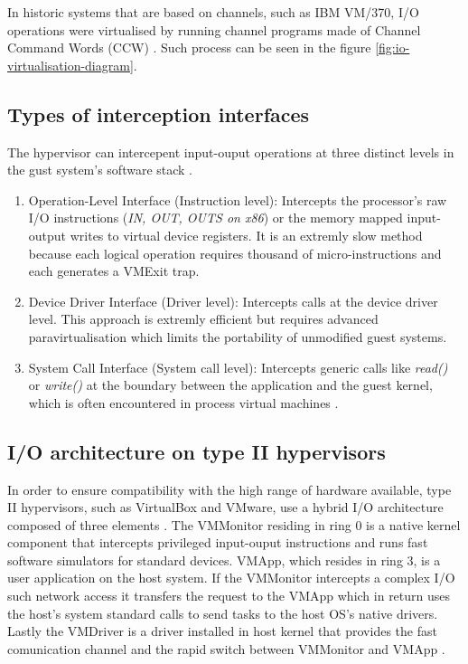 In historic systems that are based on channels, such as IBM VM/370, I/O operations were virtualised by running channel programs made of Channel Command Words (CCW) \cite{smith2005virtual}. Such process can be seen in the figure \ref{fig:io-virtualisation-diagram}.

\subsection{Types of interception interfaces}
The hypervisor can intercepent input-ouput operations at three distinct levels in the gust system's software stack \cite{smith2005virtual}.
    
    \begin{enumerate}
        \item Operation-Level Interface (Instruction level): Intercepts the processor's raw I/O instructions (\emph{IN, OUT, OUTS on x86}) or the memory mapped input-output writes to virtual device registers. It is an extremly slow method because each logical operation requires thousand of micro-instructions and each generates a VMExit trap.
        \item Device Driver Interface (Driver level): Intercepts calls at the device driver level. This approach is extremly efficient but requires advanced paravirtualisation which limits the portability of unmodified guest systems.
        \item System Call Interface (System call level): Intercepts generic calls like \emph{read()} or \emph{write()} at the boundary between the application and the guest kernel, which is often encountered in process virtual machines \cite{smith2005virtual}.
    \end{enumerate}

\subsection{I/O architecture on type II hypervisors}
In order to ensure compatibility with the high range of hardware available, type II hypervisors, such as VirtualBox and VMware, use a hybrid I/O architecture composed of three elements \cite{king.pdf}. The VMMonitor residing in ring 0 is a native kernel component that intercepts privileged input-ouput instructions and runs fast software simulators for standard devices. VMApp, which resides in ring 3, is a user application on the host system. If the VMMonitor intercepts a complex I/O such network access it transfers the request to the VMApp which in return uses the host's system standard calls to send tasks to the host OS's native drivers. Lastly the VMDriver is a driver installed in host kernel that provides the fast comunication channel and the rapid switch between VMMonitor and VMApp \cite{king.pdf}.

